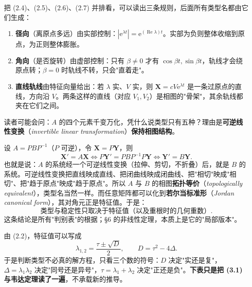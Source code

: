 \documentclass[11pt]{ctexart}
\newcommand{\X}{\mathbf{X}}\newcommand{\Y}{\mathbf{Y}}
\newcommand{\abs}[1]{\left|#1\right|}
\newcommand{\EN}[1]{\textcolor{inkgray}{\itshape #1}}
\begin{document}

把 (2.4)、(2.5)、(2.6)、(2.7) 并排看，可以读出三条规则，后面所有类型名都由它们生成：

\begin{enumerate}
\item \textbf{径向}（离原点多远）由实部控制：$\abs{\mathrm{e}^{\lambda t}}=\mathrm{e}^{(\operatorname{Re}\lambda)t}$。实部为负则整体收缩到原点，为正则整体膨胀。
\item \textbf{角向}（是否旋转）由虚部控制：只有 $\beta\neq0$ 才有 $\cos\beta t,\sin\beta t$，轨线才会绕原点转；$\beta=0$ 时轨线不转，只会"直着走"。
\item \textbf{直线轨线}由特征向量给出：若 $\lambda$ 实、$V$ 实，则 $\X=cV\mathrm{e}^{\lambda t}$ 是一条过原点的直线，方向沿 $V$。两条这样的直线（对应 $V_1,V_2$）是相图的"骨架"，其余轨线都夹在它们之间。
\end{enumerate}


读者可能会问：$A$ 的四个元素千变万化，凭什么说类型只有五种？理由是\textbf{可逆线性变换}（\EN{invertible linear transformation}）\textbf{保持相图结构}。

设 $A=PBP^{-1}$（$P$ 可逆），令 $\X=P\Y$，则
\[
\X'=A\X\iff P\Y'=PBP^{-1}P\Y\iff \Y'=B\Y .
\]
也就是说：$A$ 的系统经一个可逆线性变换（拉伸、剪切，不折叠）后，就是 $B$ 的系统。可逆线性变换把直线映成直线、把闭曲线映成闭曲线、把"相切"映成"相切"、把"趋于原点"映成"趋于原点"。所以 $A$ 与 $B$ 的相图\textbf{拓扑等价}（\EN{topologically equivalent}），类型名当然一样。而任意矩阵都可以化到\textbf{若尔当标准形}（\EN{Jordan canonical form}），其对角元正是特征值。于是：
\[
\text{类型与稳定性只取决于特征值（以及重根时的几何重数）}.
\]
这条结论是所有"判别表"的根据；§6 的非线性定理，本质上是它的"局部版本"。



由 (2.2)，特征值可以写成
\[
\lambda_{1,2}=\frac{\tau\pm\sqrt{D}}{2},\qquad D=\tau^{2}-4\Delta .
\tag{3.1}
\]
于是判断类型不必真的解方程，只看三个数的符号：$D$ 决定"实还是复"，$\Delta=\lambda_1\lambda_2$ 决定"同号还是异号"，$\tau=\lambda_1+\lambda_2$ 决定"正还是负"。\textbf{下表只是把 (3.1) 与韦达定理读了一遍}，不承载新的推导。
\end{document}
